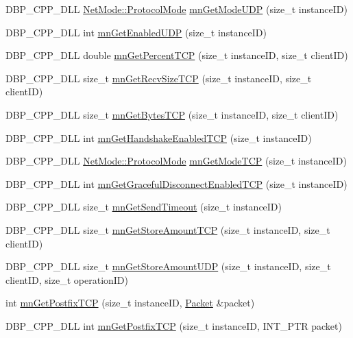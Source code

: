 \begin{DoxyCompactItemize}
\item 
DBP\_\-CPP\_\-DLL \hyperlink{class_net_mode_a43cfa55ee6a4db66a8d7d6c27f766964}{NetMode::ProtocolMode} \hyperlink{group__proc_commands_gafde552e5f3aee9bab9d4e913a6fb013c}{mnGetModeUDP} (size\_\-t instanceID)
\item 
DBP\_\-CPP\_\-DLL int \hyperlink{group__proc_commands_ga7ef175fdabecd51849b547b8b8189f7a}{mnGetEnabledUDP} (size\_\-t instanceID)
\item 
DBP\_\-CPP\_\-DLL double \hyperlink{group__proc_commands_ga922264b7d67b59a1082ff2c6a41becd0}{mnGetPercentTCP} (size\_\-t instanceID, size\_\-t clientID)
\item 
DBP\_\-CPP\_\-DLL size\_\-t \hyperlink{group__proc_commands_ga44af1a9b458dbd2fe537304d3056be3f}{mnGetRecvSizeTCP} (size\_\-t instanceID, size\_\-t clientID)
\item 
DBP\_\-CPP\_\-DLL size\_\-t \hyperlink{group__proc_commands_ga148c4ffb0ba646210ea65ac774678790}{mnGetBytesTCP} (size\_\-t instanceID, size\_\-t clientID)
\item 
DBP\_\-CPP\_\-DLL int \hyperlink{group__proc_commands_ga7e9fa40cd084c812db742bb6c7cccab1}{mnGetHandshakeEnabledTCP} (size\_\-t instanceID)
\item 
DBP\_\-CPP\_\-DLL \hyperlink{class_net_mode_a43cfa55ee6a4db66a8d7d6c27f766964}{NetMode::ProtocolMode} \hyperlink{group__proc_commands_gaf99961eb824319fa3c46d16e9591dd2a}{mnGetModeTCP} (size\_\-t instanceID)
\item 
DBP\_\-CPP\_\-DLL int \hyperlink{group__proc_commands_ga2d4e1426b9394a3000dc9e3171cd2b91}{mnGetGracefulDisconnectEnabledTCP} (size\_\-t instanceID)
\item 
DBP\_\-CPP\_\-DLL size\_\-t \hyperlink{group__proc_commands_gaee054d4d3417ea53f73a83964c15aa8b}{mnGetSendTimeout} (size\_\-t instanceID)
\item 
DBP\_\-CPP\_\-DLL size\_\-t \hyperlink{group__proc_commands_gaa766b35aa60438d4333ffefa943b34e5}{mnGetStoreAmountTCP} (size\_\-t instanceID, size\_\-t clientID)
\item 
DBP\_\-CPP\_\-DLL size\_\-t \hyperlink{group__proc_commands_ga65a491d5eefeb9d5a8b2266cc1c89db4}{mnGetStoreAmountUDP} (size\_\-t instanceID, size\_\-t clientID, size\_\-t operationID)
\item 
int \hyperlink{group__proc_commands_ga5a7015eba81f69c5e542d80672932730}{mnGetPostfixTCP} (size\_\-t instanceID, \hyperlink{class_packet}{Packet} \&packet)
\item 
DBP\_\-CPP\_\-DLL int \hyperlink{group__proc_commands_ga93ce24610df1cd2ba4bfa5677751314b}{mnGetPostfixTCP} (size\_\-t instanceID, INT\_\-PTR packet)

\end{DoxyCompactItemize}
